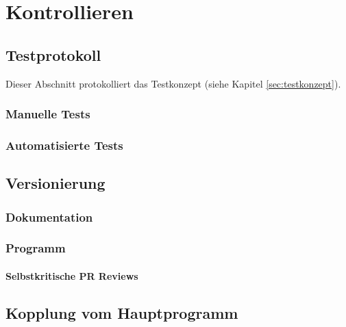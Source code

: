\chapter{Kontrollieren}

\section{Testprotokoll}
Dieser Abschnitt protokolliert das Testkonzept (siehe Kapitel \ref{sec:testkonzept}).
\subsection{Manuelle Tests}
\label{sec:automated-tests}

\subsection{Automatisierte Tests}
\label{sec:manual-tests}

\section{Versionierung}
\subsection{Dokumentation}
\subsection{Programm}
\subsubsection{Selbstkritische PR Reviews}

\section{Kopplung vom Hauptprogramm}


